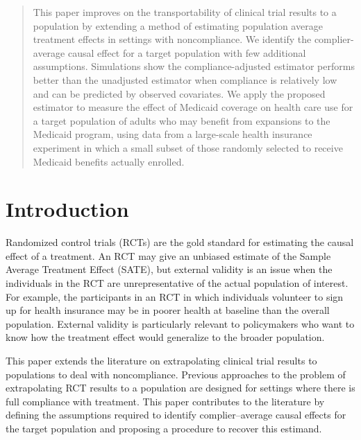 \documentclass[hidelinks,12pt]{article}
\begin{document}
\begin{singlespace} %
\maketitle  

\thispagestyle{empty}
\begin{abstract}  
\noindent 
This paper {\color{red} improves on the transportability of clinical trial results to a population by extending a method of estimating population average treatment effects in settings with noncompliance.} We identify the complier-average causal effect for {\color{red}a} target population with few additional assumptions. Simulations show the compliance-adjusted estimator performs better than the unadjusted estimator when compliance is relatively low and can be predicted by observed covariates. We apply the proposed estimator to measure the effect of Medicaid coverage on health care use for a target population of adults who may benefit from expansions to the Medicaid program{\color{red}, using} data from a large-scale health insurance experiment in which a small subset of those randomly selected to receive Medicaid benefits actually enrolled.
\end{abstract}	

\end{singlespace}
\pagebreak
\setcounter{page}{1} %

\vspace{20mm}

\section{Introduction}\label{intro}
Randomized control trials (RCTs) are the gold standard for estimating the causal effect of a treatment. An RCT may give an unbiased estimate of the Sample Average Treatment Effect (SATE), but external validity is an issue when the individuals in the RCT are unrepresentative of the actual population of interest. For example, the participants in an RCT in which individuals volunteer to sign up for health insurance may be in poorer health at baseline than the overall population. External validity is particularly relevant to policymakers who want to know how the treatment effect would generalize to the broader population. 

{\color{red}This paper extends the literature on extrapolating clinical trial results to populations to deal with noncompliance. Previous approaches to the problem of extrapolating RCT results to a population \citep{ImaKinStu08, stuart2011use, Hartman} are designed for settings where there is full compliance with treatment. This paper contributes to the literature by defining the assumptions required to identify complier--average causal effects for the target population and proposing a procedure to recover this estimand.} 
\end{document}
